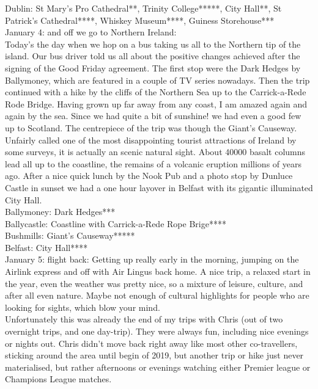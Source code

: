 Dublin: St Mary's Pro Cathedral**, Trinity College*****, City Hall**, St Patrick's Cathedral****, Whiskey Museum****, Guiness Storehouse***\\

January 4: and off we go to Northern Ireland:\\
Today's the day when we hop on a bus taking us all to the Northern tip of the island. Our bus driver told us all about the positive changes achieved after the signing of the Good Friday agreement. The first stop were the Dark Hedges by Ballymoney, which are featured in a couple of TV series nowadays. Then the trip continued with a hike by the cliffs of the Northern Sea up to the Carrick-a-Rede Rode Bridge. Having grown up far away from any coast, I am amazed again and again by the sea. Since we had quite a bit of sunshine! we had even a good few up to Scotland. The centrepiece of the trip was though the Giant's Causeway. Unfairly called one of the most disappointing tourist attractions of Ireland by some surveys, it is actually an scenic natural sight. About 40000 basalt columns lead all up to the coastline, the remains of a volcanic eruption millions of years ago. After a nice quick lunch by the Nook Pub and a photo stop by Dunluce Castle in sunset we had a one hour layover in Belfast with its gigantic illuminated City Hall.\\

Ballymoney: Dark Hedges***\\
Ballycastle: Coastline with Carrick-a-Rede Rope Brige****\\
Bushmills: Giant's Causeway*****\\
Belfast: City Hall****\\

January 5: flight back: 
Getting up really early in the morning, jumping on the Airlink express and off with Air Lingus back home. A nice trip, a relaxed start in the year, even the weather was pretty nice, so a mixture of leisure, culture, and after all even nature. Maybe not enough of cultural highlights for people who are looking for sights, which blow your mind.\\

Unfortunately this was already the end of my trips with Chris (out of two overnight trips, and one day-trip). They were always fun, including nice evenings or nights out. Chris didn't move back right away like most other co-travellers, sticking around the area until begin of 2019, but another trip or hike just never materialised, but rather afternoons or evenings watching either Premier league or Champions League matches.


